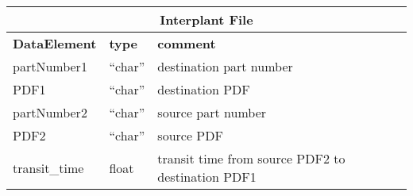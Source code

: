 \vspace{.5in}

\begin{tabular}{llp{4in}}
\multicolumn{3}{c}{{\bf Interplant File}}\\ 
     \hline\hline
{\bf DataElement} &  {\bf type}  &   {\bf comment} \\ \hline
partNumber1  & ``char'' &    destination part number \\
PDF1   & ``char''    &    destination PDF \\
partNumber2  & ``char'' &     source part number \\
PDF2   & ``char''  &         source PDF \\
transit\_time     & float  &    transit time from source PDF2 to destination PDF1
\end{tabular}


